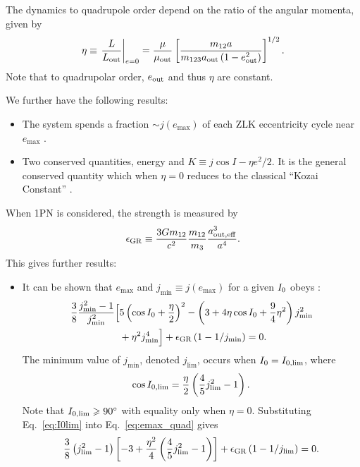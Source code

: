 \documentclass[
        fleqn,
        usenatbib,
    ]{mnras}
\newcommand*{\at}[1]{\left.#1\right|}
\newcommand*{\p}[1]{\left(#1\right)}
\newcommand*{\s}[1]{\left[#1\right]}
\begin{document}
The dynamics to quadrupole order depend on the ratio of the angular momenta,
given by
\begin{equation}
    \eta \equiv \at{\frac{L}{L_{\rm out}}}_{e = 0}
        = \frac{\mu}{\mu_{\rm out}}\s{\frac{m_{12}a}
            {m_{123}a_{\rm out}\p{1 - e_{\rm out}^2}}}^{1/2}.
\end{equation}
Note that to quadrupolar order, $e_{\rm out}$ and thus $\eta$ are constant.

We further have the following results:
\begin{itemize}
    \item The system spends a fraction $\sim j(e_{\max})$ of each ZLK
        eccentricity cycle near $e_{\max}$ \citep{anderson2016formation}.

    \item Two conserved quantities, energy and $K \equiv j \cos I - \eta e^2 /
        2$. It is the general conserved quantity which when $\eta = 0$ reduces
        to the classical ``Kozai Constant'' \citep{LML15}.
\end{itemize}

When 1PN is considered, the strength is measured by
\begin{equation}
    \epsilon_{\rm GR} \equiv \frac{3Gm_{12}}{c^2}
        \frac{m_{12}}{m_3}\frac{a_{\rm out, eff}^3}{a^4}.
\end{equation}
This gives further results:
\begin{itemize}
    \item It can be shown that $e_{\max}$ and $j_{\min} \equiv j(e_{\max})$ for
        a given $I_{\rm 0}$ obeys \citep{LML15, anderson2016formation}:
        \begin{align}
            \frac{3}{8}\frac{j_{\min}^2 - 1}{j_{\min}^2}\Big[&
                5\p{\cos I_0 + \frac{\eta}{2}}^2
                - \p{3 + 4\eta \cos I_0 + \frac{9}{4}\eta^2}j_{\min}^2
                    \nonumber\\
                &+ \eta^2 j_{\min}^4
            \Big] + \epsilon_{\rm GR}\p{1 - 1 / j_{\min}} = 0.\label{eq:emax_quad}
        \end{align}
        The minimum value of $j_{\min}$, denoted $j_{\lim}$, occurs when $I_0
        = I_{\rm 0, \lim}$, where
        \begin{equation}
            \cos I_{\rm 0, \lim} = \frac{\eta}{2}\p{\frac{4}{5}j_{\lim}^2 -
                1}.\label{eq:I0lim}
        \end{equation}
        Note that $I_{\rm 0, \lim} \geq 90^\circ$ with equality only when $\eta
        = 0$. Substituting Eq.~\eqref{eq:I0lim} into Eq.~\eqref{eq:emax_quad}
        gives
        \begin{equation}
            \frac{3}{8}\p{j_{\lim}^2 - 1}\s{-3 + \frac{\eta^2}{4}
                \p{\frac{4}{5}j_{\lim}^2 - 1}}
                + \epsilon_{\rm GR}\p{1 - 1 / j_{\lim}} = 0.
        \end{equation}
\end{itemize}
\end{document}
